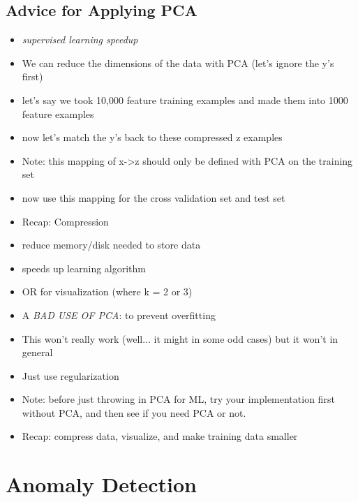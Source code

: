 \documentclass[]{article}
\begin{document}
	\subsection{Advice for Applying PCA}
		\begin{itemize}
			\item \emph{supervised learning speedup}
			\item We can reduce the dimensions of the data with PCA (let's ignore the y's first)
			\item let's say we took 10,000 feature training examples and made them into 1000 feature examples
			\item now let's match the y's back to these compressed z examples
			\item Note: this mapping of x->z should only be defined with PCA on the training set
			\item now use this mapping for the cross validation set and test set
			\\
			\item Recap: Compression
			\item reduce memory/disk needed to store data
			\item speeds up learning algorithm
			\item OR for visualization (where k = 2 or 3)
			\\
			\item A \emph{BAD USE OF PCA}: to prevent overfitting
			\item This won't really work (well... it might in some odd cases) but it won't in general
			\item Just use regularization
			\\
			\item Note: before just throwing in PCA for ML, try your implementation first without PCA, and then see if you need PCA or not.
			\item Recap: compress data, visualize, and make training data smaller
		\end{itemize}
		
\section{Anomaly Detection}
\end{document}
